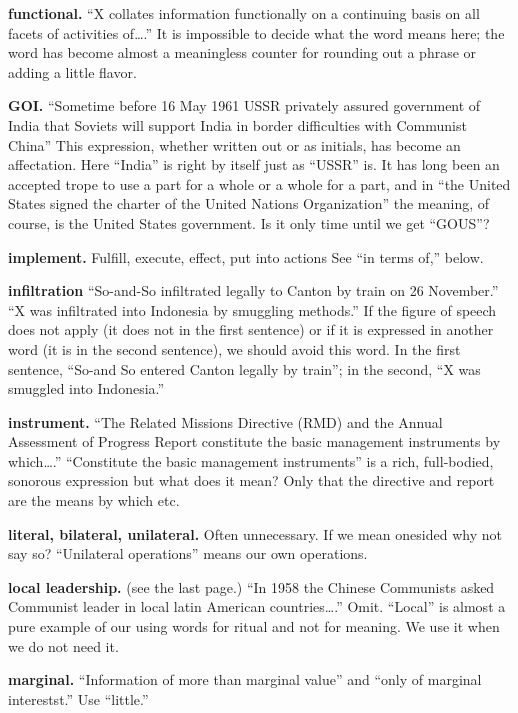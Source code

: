 \documentclass[
    oneside,
    11pt,
    draft
]{memoir}
\begin{document}
\textbf{functional.} \enquote{X collates information functionally on a continuing basis on all facets of activities of\dots.} It is impossible to decide what the word means here; the word has become almost a meaningless counter for rounding out a phrase or adding a little flavor.

\textbf{GOI.} \enquote{Sometime before 16 May 1961 USSR privately assured government of India that Soviets will support India in border difficulties with Communist China} This expression, whether written out or as initials, has become an affectation. Here \enquote{India} is right by itself just as \enquote{USSR} is. It has long been an accepted trope to use a part for a whole or a whole for a part, and in \enquote{the United States signed the charter of the United Nations Organization} the meaning, of course, is the United States government. Is it only time until we get \enquote{GOUS}? 

\textbf{implement.} Fulfill, execute, effect, put into actions See \enquote{in terms of,} below. 

\textbf{infiltration} \enquote{So-and-So infiltrated legally to Canton by train on 26 November.} \enquote{X was infiltrated into Indonesia by smuggling methods.} If the figure of speech does not apply (it does not in the first sentence) or if it is expressed in another word (it is in the second sentence), we should avoid this word. In the first sentence, \enquote{So-and So entered Canton legally by train}; in the second, \enquote{X was smuggled into Indonesia.}

\textbf{instrument.} \enquote{The Related Missions Directive (RMD) and the Annual Assessment of Progress Report constitute the basic management instruments by which\dots.} \enquote{Constitute the basic management instruments} is a rich, full-bodied, sonorous expression but what does it mean? Only that the directive and report are the means by which etc. 

\textbf{literal, bilateral, unilateral.} Often unnecessary. If we mean onesided why not say so? \enquote{Unilateral operations} means our own operations.

\textbf{local leadership.} (see the last page.) \enquote{In 1958 the Chinese Communists asked Communist leader in local latin American countries\dots.} Omit. \enquote{Local} is almost a pure example of our using words for ritual and not for meaning. We use it when we do not need it.

\textbf{marginal.} \enquote{Information of more than marginal value} and \enquote{only of marginal interestst.} Use \enquote{little.}
\end{document}

